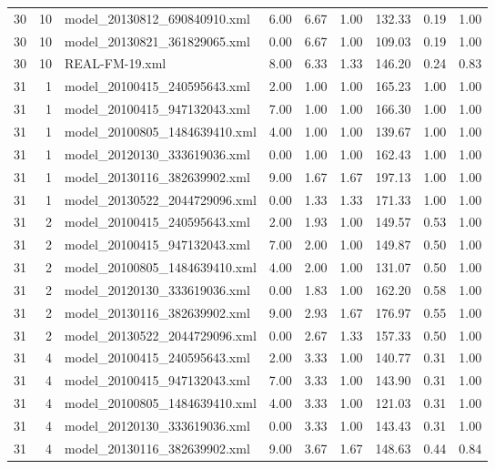 \begin{table}[ht]
\begin{tabular}{rrlrrrrrr}
   30 &  10 & model\_20130812\_690840910.xml & 6.00 & 6.67 & 1.00 & 132.33 & 0.19 & 1.00 \\ 
   30 &  10 & model\_20130821\_361829065.xml & 0.00 & 6.67 & 1.00 & 109.03 & 0.19 & 1.00 \\ 
   30 &  10 & REAL-FM-19.xml & 8.00 & 6.33 & 1.33 & 146.20 & 0.24 & 0.83 \\ 
   31 &   1 & model\_20100415\_240595643.xml & 2.00 & 1.00 & 1.00 & 165.23 & 1.00 & 1.00 \\ 
   31 &   1 & model\_20100415\_947132043.xml & 7.00 & 1.00 & 1.00 & 166.30 & 1.00 & 1.00 \\ 
   31 &   1 & model\_20100805\_1484639410.xml & 4.00 & 1.00 & 1.00 & 139.67 & 1.00 & 1.00 \\ 
   31 &   1 & model\_20120130\_333619036.xml & 0.00 & 1.00 & 1.00 & 162.43 & 1.00 & 1.00 \\ 
   31 &   1 & model\_20130116\_382639902.xml & 9.00 & 1.67 & 1.67 & 197.13 & 1.00 & 1.00 \\ 
   31 &   1 & model\_20130522\_2044729096.xml & 0.00 & 1.33 & 1.33 & 171.33 & 1.00 & 1.00 \\ 
   31 &   2 & model\_20100415\_240595643.xml & 2.00 & 1.93 & 1.00 & 149.57 & 0.53 & 1.00 \\ 
   31 &   2 & model\_20100415\_947132043.xml & 7.00 & 2.00 & 1.00 & 149.87 & 0.50 & 1.00 \\ 
   31 &   2 & model\_20100805\_1484639410.xml & 4.00 & 2.00 & 1.00 & 131.07 & 0.50 & 1.00 \\ 
   31 &   2 & model\_20120130\_333619036.xml & 0.00 & 1.83 & 1.00 & 162.20 & 0.58 & 1.00 \\ 
   31 &   2 & model\_20130116\_382639902.xml & 9.00 & 2.93 & 1.67 & 176.97 & 0.55 & 1.00 \\ 
   31 &   2 & model\_20130522\_2044729096.xml & 0.00 & 2.67 & 1.33 & 157.33 & 0.50 & 1.00 \\ 
   31 &   4 & model\_20100415\_240595643.xml & 2.00 & 3.33 & 1.00 & 140.77 & 0.31 & 1.00 \\ 
   31 &   4 & model\_20100415\_947132043.xml & 7.00 & 3.33 & 1.00 & 143.90 & 0.31 & 1.00 \\ 
   31 &   4 & model\_20100805\_1484639410.xml & 4.00 & 3.33 & 1.00 & 121.03 & 0.31 & 1.00 \\ 
   31 &   4 & model\_20120130\_333619036.xml & 0.00 & 3.33 & 1.00 & 143.43 & 0.31 & 1.00 \\ 
   31 &   4 & model\_20130116\_382639902.xml & 9.00 & 3.67 & 1.67 & 148.63 & 0.44 & 0.84 \\ 

\end{tabular}
\end{table}
